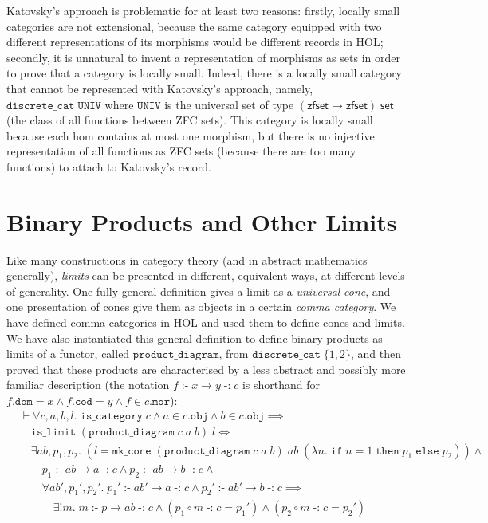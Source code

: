 \documentclass[twoside,titlepage,11pt]{article}
\begin{document}
Katovsky's approach is problematic for at least two reasons: firstly, locally small categories are not extensional, because the same category equipped with two different representations of its morphisms would be different records in HOL; secondly, it is unnatural to invent a representation of morphisms as sets in order to prove that a category is locally small.
Indeed, there is a locally small category that cannot be represented with Katovsky's approach, namely, $\mathtt{discrete\_cat}\;\mathtt{UNIV}$ where $\mathtt{UNIV}$ is the universal set of type $(\mathsf{zfset}\to\mathsf{zfset})\;\mathsf{set}$ (the class of all functions between ZFC sets).
This category is locally small because each hom contains at most one morphism, but there is no injective representation of all functions as ZFC sets (because there are too many functions) to attach to Katovsky's record.
\section{Binary Products and Other Limits}%
\label{limits}
Like many constructions in category theory (and in abstract mathematics generally), \emph{limits} can be presented in different, equivalent ways, at different levels of generality.
One fully general definition gives a limit as a \emph{universal} \emph{cone}, and one presentation of cones give them as objects in a certain \emph{comma category}.
We have defined comma categories in HOL and used them to define cones and limits.
We have also instantiated this general definition to define binary products as limits of a functor, called $\mathtt{product\_diagram}$, from $\mathtt{discrete\_cat}\;\{1,2\}$, and then proved that these products are characterised by a less abstract and possibly more familiar description (the notation $f\operatorname{\mathtt{:-}}x\to y\operatorname{\mathtt{-:}}c$ is shorthand for $f.\mathtt{dom}=x\land f.\mathtt{cod}=y\land f\in c.\mathtt{mor}$):
\begin{align*}
&\vdash\forall{c,a,b,l}.\;\mathtt{is\_category}\;c\land a\in c.\mathtt{obj}\land b \in c.\mathtt{obj}\implies\\
&\quad\mathtt{is\_limit}\;(\mathtt{product\_diagram}\;c\;a\;b)\;l\iff\\
&\quad\exists{ab,p_1,p_2}.\;(l = \mathtt{mk\_cone}\;(\mathtt{product\_diagram}\;c\;a\;b)\;ab\;(\lambda{n}.\; \mathtt{if}\;n = 1\;\mathtt{then}\;p_1\;\mathtt{else}\;p_2))\land{}\\
&\quad\quad p_1\operatorname{\mathtt{:-}}ab \to a\operatorname{\mathtt{-:}}c\land p_2\operatorname{\mathtt{:-}}ab \to b\operatorname{\mathtt{-:}}c\land{}\\
&\quad\quad\forall{ab',p_1',p_2'}.\;
p_1'\operatorname{\mathtt{:-}} ab' \to a \operatorname{\mathtt{-:}}c\land
p_2'\operatorname{\mathtt{:-}} ab' \to b \operatorname{\mathtt{-:}}c\implies\\
&\quad\quad\quad\exists!{m}.\;
m\operatorname{\mathtt{:-}}p\to ab\operatorname{\mathtt{-:}}c\land(p_1\circ m\operatorname{\mathtt{-:}}c = p_1')\land(p_2\circ m\operatorname{\mathtt{-:}}c = p_2')
\end{align*}
\end{document}
